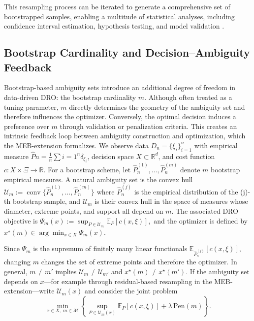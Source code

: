 \documentclass[11pt]{article}
\begin{document}
This resampling process can be iterated to generate a comprehensive set of bootstrapped samples, enabling a multitude of statistical analyses, including confidence interval estimation, hypothesis testing, and model validation \citep{efron1993introduction}. 

\subsection{Bootstrap Cardinality and Decision--Ambiguity Feedback} \label{Subsec:ambiguity}

Bootstrap-based ambiguity sets introduce an additional degree of freedom in data-driven DRO: the bootstrap cardinality $m$. Although often treated as a tuning parameter, $m$ directly determines the geometry of the ambiguity set and therefore influences the optimizer. Conversely, the optimal decision induces a preference over $m$ through validation or penalization criteria. This creates an intrinsic feedback loop between ambiguity construction and optimization, which the MEB-extension formalizes.
We observe data $D_n=\{\xi_i\}_{i=1}^n$ with empirical measure
$\widehat{P}n=\frac{1}{n}\sum{i=1}^n \delta_{\xi_i}$, decision space $X\subset\mathbb{R}^d$, and cost function $c:X\times\Xi\to\mathbb{R}$.  
For a bootstrap scheme, let $\widehat{P}_n^{(1)},\dots,\widehat{P}_n^{(m)}$ denote $m$ bootstrap empirical measures.  
A natural ambiguity set is the convex hull
$\mathcal{U}_m := \operatorname{conv}\{\widehat{P}_n^{(1)},\dots,\widehat{P}_n^{(m)}\}$	
where $\widehat{P}_n^{(j)}$ is the empirical distribution of the (j)-th bootstrap sample, and $\mathcal U_m$ is their convex hull in the space of measures whose diameter, extreme points, and support all depend on $m$.
The associated DRO objective is $\Psi_m(x) := \sup_{P\in\mathcal{U}_m} \mathbb{E}_P[c(x,\xi)],
$ and the optimizer is defined by $x^\star(m)\in\arg\min_{x\in X}\Psi_m(x)$.

Since $\Psi_m$ is the supremum of finitely many linear functionals $\mathbb{E}_{\widehat{P}_n^{(j)}}[c(x,\xi)]$, changing $m$ changes the set of extreme points and therefore the optimizer. In general, $m\neq m'$ implies $\mathcal{U}_m\neq\mathcal{U}_{m'}$ and $x^\star(m)\neq x^\star(m')$.
If the ambiguity set depends on $x$—for example through residual-based resampling in the MEB-extension—write $\mathcal{U}_m(x)$ and consider the joint problem
\begin{equation}
	\min_{x\in X,\; m\in\mathcal{M}}
	\left\{
	\sup_{P\in\mathcal{U}_m(x)} \mathbb{E}_P[c(x,\xi)]
	+ \lambda\,\mathrm{Pen}(m)
	\right\}.
\end{equation}
\end{document}
